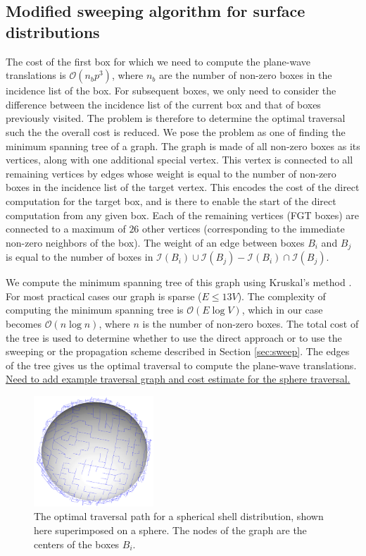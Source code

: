 \subsection{Modified sweeping algorithm for surface distributions} 
\label{sec:mst}
The cost of the first box for which we need to compute the plane-wave translations is $\mathcal{O}(n_bp^3)$, where $n_b$ are the number of non-zero boxes in the incidence list of the box. For subsequent boxes, we only need to consider the difference between the incidence list of the current box and that of boxes previously visited. The problem is therefore to determine the optimal traversal such the the overall cost is reduced. We pose the problem as one of finding the minimum spanning tree of a graph. The graph is made of all non-zero boxes as its vertices, along with one additional special vertex. This vertex is connected to all remaining vertices by edges whose weight is equal to the number of non-zero boxes in the incidence list of the target vertex. This encodes the cost of the direct computation for the target box, and is there to enable the start of the direct computation from any given box. Each of the remaining vertices (FGT boxes) are connected to a maximum of $26$ other vertices (corresponding to the immediate non-zero neighbors of the box). The weight of an edge between boxes $B_i$ and $B_j$ is equal to the number of boxes in $\mathcal{I}(B_i)\cup\mathcal{I}(B_j) - \mathcal{I}(B_i)\cap\mathcal{I}(B_j)$.    

We compute the minimum spanning tree of this graph using Kruskal's method \cite{kruskal56}. For most practical cases our graph is sparse ($E\le13V$). The complexity of computing the minimum spanning tree is $\mathcal{O}(E\log V)$, which in our case becomes $\mathcal{O}(n\log n)$, where $n$ is the number of non-zero boxes. The total cost of the tree is used to determine whether to use the direct approach or to use the sweeping or the propagation scheme described in Section \ref{sec:sweep}. The edges of the tree gives us the optimal traversal to compute the plane-wave translations. \ul{Need to add example traversal graph and cost estimate for the sphere traversal.}

\begin{figure}
\centering 	
\includegraphics[width=0.4\textwidth]{figs/sphere_mst}
\caption{The optimal traversal path for a spherical shell distribution, shown here superimposed on a sphere. The nodes of the graph are the centers of the boxes $B_i$.}
\end{figure}

